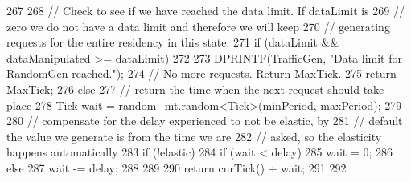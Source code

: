 \begin{DoxyCode}
267 {
268     // Check to see if we have reached the data limit. If dataLimit is
269     // zero we do not have a data limit and therefore we will keep
270     // generating requests for the entire residency in this state.
271     if (dataLimit && dataManipulated >= dataLimit)
272     {
273         DPRINTF(TrafficGen, "Data limit for RandomGen reached.\n");
274         // No more requests. Return MaxTick.
275         return MaxTick;
276     } else {
277         // return the time when the next request should take place
278         Tick wait = random_mt.random<Tick>(minPeriod, maxPeriod);
279 
280         // compensate for the delay experienced to not be elastic, by
281         // default the value we generate is from the time we are
282         // asked, so the elasticity happens automatically
283         if (!elastic) {
284             if (wait < delay)
285                 wait = 0;
286             else
287                 wait -= delay;
288         }
289 
290         return curTick() + wait;
291     }
292 }
\end{DoxyCode}


